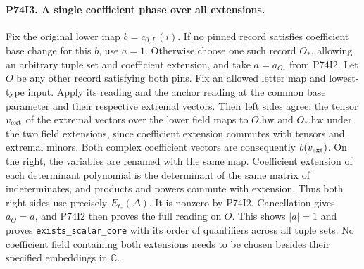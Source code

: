\paragraph{P74I3. A single coefficient phase over all extensions.}
Fix the original lower map $b=c_{0,L}(i)$. If no pinned record
satisfies coefficient base change for this $b$, use $a=1$.
Otherwise choose one such record $O_*$, allowing an arbitrary tuple
set and coefficient extension, and take $a=a_{O_*}$ from P74I2.
Let $O$ be any other record satisfying both pins. Fix an allowed
letter map and lowest-type input. Apply its reading and the anchor
reading at the common base parameter and their respective extremal
vectors. Their left sides agree: the tensor $v_{\rm ext}$ of the
extremal vectors over the lower field maps to $O.\mathrm{hw}$ and
$O_*.\mathrm{hw}$ under the two field extensions, since coefficient
extension commutes with tensors and extremal minors. Both complex
coefficient vectors are consequently $b(v_{\rm ext})$.
On the right, the variables are renamed with the same map.
Coefficient extension of each determinant polynomial is the
determinant of the same matrix of indeterminates, and products and
powers commute with extension. Thus both right sides use precisely
$E_{t_*}(\Delta)$. It is nonzero by P74I2. Cancellation gives
$a_O=a$, and P74I2 then proves the full reading on $O$. This shows
$|a|=1$ and proves \texttt{exists\_scalar\_core} with its order of
quantifiers across all tuple sets. No coefficient field containing
both extensions needs to be chosen besides their specified
embeddings in $\mathbb C$.

